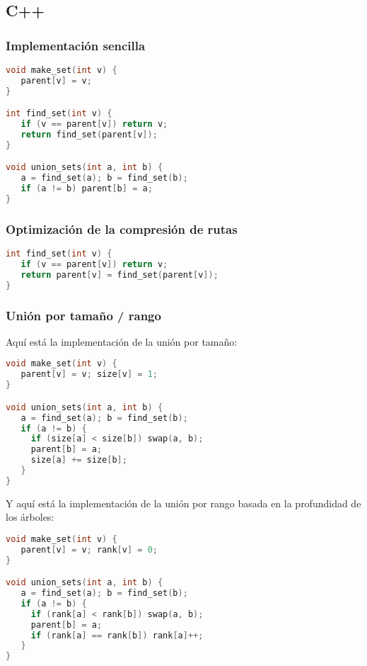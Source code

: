 \subsection{C++}

\subsubsection{Implementación sencilla}

\begin{lstlisting}[language=C++]
void make_set(int v) {
   parent[v] = v;
}

int find_set(int v) {
   if (v == parent[v]) return v;
   return find_set(parent[v]);
}

void union_sets(int a, int b) {
   a = find_set(a); b = find_set(b);
   if (a != b) parent[b] = a;
}
\end{lstlisting}

\subsubsection{Optimización de la compresión de rutas}

\begin{lstlisting}[language=C++]
int find_set(int v) {
   if (v == parent[v]) return v;
   return parent[v] = find_set(parent[v]);
}
\end{lstlisting}

\subsubsection{Unión por tamaño / rango}

Aquí está la implementación de la unión por tamaño:

\begin{lstlisting}[language=C++]
void make_set(int v) {
   parent[v] = v; size[v] = 1;
}

void union_sets(int a, int b) {
   a = find_set(a); b = find_set(b);
   if (a != b) {
     if (size[a] < size[b]) swap(a, b);
     parent[b] = a;
     size[a] += size[b];
   }
}
\end{lstlisting}

Y aquí está la implementación de la unión por rango basada en la profundidad de los árboles:

\begin{lstlisting}[language=C++]
void make_set(int v) {
   parent[v] = v; rank[v] = 0;
}

void union_sets(int a, int b) {
   a = find_set(a); b = find_set(b);
   if (a != b) {
     if (rank[a] < rank[b]) swap(a, b);
     parent[b] = a;
     if (rank[a] == rank[b]) rank[a]++;
   }
}
\end{lstlisting}

